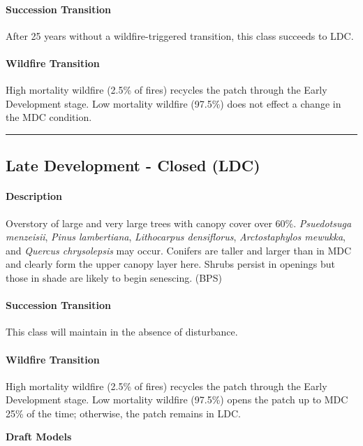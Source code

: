 \documentclass{article}
\newcommand{\mcomment}[1]{\textcolor{navy}{#1}}
\begin{document}
\paragraph{Succession Transition} After 25 years without a wildfire-triggered transition, this class succeeds to LDC.

\paragraph{Wildfire Transition} High mortality wildfire (2.5\% of fires) recycles the patch through the Early Development stage. Low mortality wildfire (97.5\%) does not effect a change in the MDC condition.

\noindent\rule{6.5in}{.02pt}

\subsection*{Late Development - Closed (LDC)}

\paragraph{Description} Overstory of large and very large trees with canopy cover over 60\%. \emph{Psuedotsuga menzeisii}, \emph{Pinus lambertiana}, \emph{Lithocarpus densiflorus}, \emph{Arctostaphylos mewukka}, and \emph{Quercus chrysolepsis} may occur. Conifers are taller and larger than in MDC and clearly form the upper canopy layer here. Shrubs persist in openings but those in shade are likely to begin senescing. (BPS)

\paragraph{Succession Transition} This class will maintain in the absence of disturbance.

\paragraph{Wildfire Transition} High mortality wildfire (2.5\% of fires) recycles the patch through the Early Development stage. Low mortality wildfire (97.5\%) opens the patch up to MDC 25\% of the time; otherwise, the patch remains in LDC.


\begin{snugshade}\Large \textbf{Draft Models} \end{snugshade}
\end{document}
